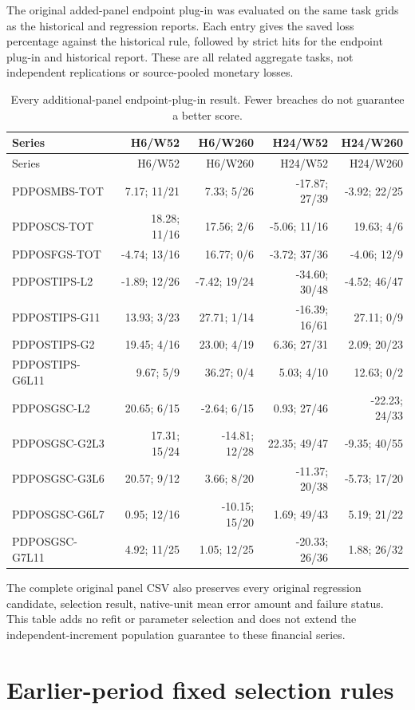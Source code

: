\documentclass[11pt,a4paper]{article}
\begin{document}
The original added-panel endpoint plug-in was evaluated on the
same task grids as the historical and regression reports. Each entry gives
the saved loss percentage against the historical rule, followed by strict
hits for the endpoint plug-in and historical report. These are all related
aggregate tasks, not independent replications or source-pooled monetary losses.
\begingroup
\scriptsize
\setlength{\tabcolsep}{3pt}
\renewcommand{\arraystretch}{1.12}
\begin{longtable}{p{30mm}rrrr}
\caption{Every additional-panel endpoint-plug-in result. Fewer breaches do not guarantee a better score.}\\
\toprule
Series & H6/W52 & H6/W260 & H24/W52 & H24/W260 \\
\midrule
\endfirsthead
\toprule
Series & H6/W52 & H6/W260 & H24/W52 & H24/W260 \\
\midrule
\endhead
\bottomrule
\endfoot
PDPOSMBS-TOT & 7.17; 11/21 & 7.33; 5/26 & -17.87; 27/39 & -3.92; 22/25 \\
PDPOSCS-TOT & 18.28; 11/16 & 17.56; 2/6 & -5.06; 11/16 & 19.63; 4/6 \\
PDPOSFGS-TOT & -4.74; 13/16 & 16.77; 0/6 & -3.72; 37/36 & -4.06; 12/9 \\
PDPOSTIPS-L2 & -1.89; 12/26 & -7.42; 19/24 & -34.60; 30/48 & -4.52; 46/47 \\
PDPOSTIPS-G11 & 13.93; 3/23 & 27.71; 1/14 & -16.39; 16/61 & 27.11; 0/9 \\
PDPOSTIPS-G2 & 19.45; 4/16 & 23.00; 4/19 & 6.36; 27/31 & 2.09; 20/23 \\
PDPOSTIPS-G6L11 & 9.67; 5/9 & 36.27; 0/4 & 5.03; 4/10 & 12.63; 0/2 \\
PDPOSGSC-L2 & 20.65; 6/15 & -2.64; 6/15 & 0.93; 27/46 & -22.23; 24/33 \\
PDPOSGSC-G2L3 & 17.31; 15/24 & -14.81; 12/28 & 22.35; 49/47 & -9.35; 40/55 \\
PDPOSGSC-G3L6 & 20.57; 9/12 & 3.66; 8/20 & -11.37; 20/38 & -5.73; 17/20 \\
PDPOSGSC-G6L7 & 0.95; 12/16 & -10.15; 15/20 & 1.69; 49/43 & 5.19; 21/22 \\
PDPOSGSC-G7L11 & 4.92; 11/25 & 1.05; 12/25 & -20.33; 26/36 & 1.88; 26/32 \\
\end{longtable}
\endgroup

The complete original panel CSV also preserves every original
regression candidate, selection result, native-unit mean error amount and
failure status. This table adds no refit or parameter selection and does not
extend the independent-increment population guarantee to these financial
series.\section{Earlier-period fixed selection rules}\label{sup:selection}
\end{document}
